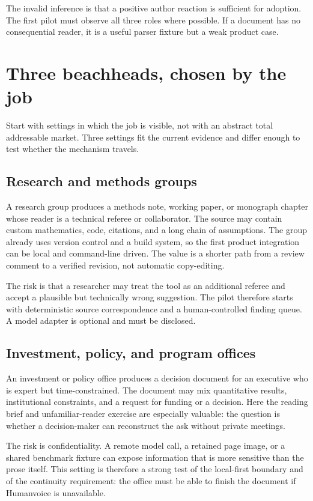 The invalid inference is that a positive author reaction is sufficient for
adoption. The first pilot must observe all three roles where possible. If a
document has no consequential reader, it is a useful parser fixture but a
weak product case.

\section{Three beachheads, chosen by the job}
\label{sec:adoption-beachheads}

Start with settings in which the job is visible, not with an abstract total
addressable market. Three settings fit the current evidence and differ enough
to test whether the mechanism travels.

\subsection{Research and methods groups}

A research group produces a methods note, working paper, or monograph chapter
whose reader is a technical referee or collaborator. The source may contain
custom mathematics, code, citations, and a long chain of assumptions. The
group already uses version control and a build system, so the first product
integration can be local and command-line driven. The value is a shorter path
from a review comment to a verified revision, not automatic copy-editing.

The risk is that a researcher may treat the tool as an additional referee and
accept a plausible but technically wrong suggestion. The pilot therefore
starts with deterministic source correspondence and a human-controlled
finding queue. A model adapter is optional and must be disclosed.

\subsection{Investment, policy, and program offices}

An investment or policy office produces a decision document for an executive
who is expert but time-constrained. The document may mix quantitative results,
institutional constraints, and a request for funding or a decision. Here
the reading brief and unfamiliar-reader exercise are especially valuable: the
question is whether a decision-maker can reconstruct the ask without private
meetings.

The risk is confidentiality. A remote model call, a retained page image, or a
shared benchmark fixture can expose information that is more sensitive than
the prose itself. This setting is therefore a strong test of the local-first
boundary and of the continuity requirement: the office must be able to finish
the document if Humanvoice is unavailable.

